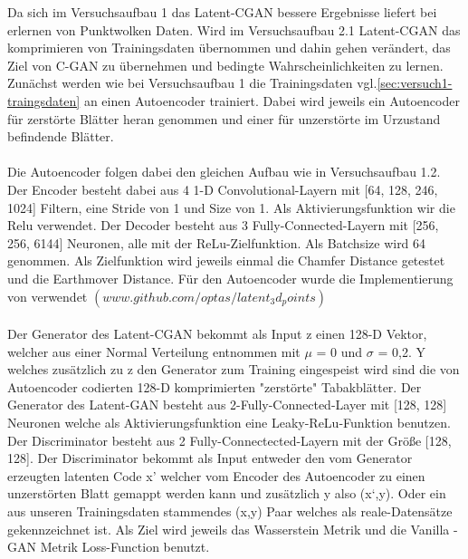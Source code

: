 \documentclass{llncs}
\begin{document}
Da sich im Versuchsaufbau 1 das Latent-CGAN bessere Ergebnisse liefert bei erlernen von Punktwolken Daten. Wird im Versuchsaufbau 2.1 Latent-CGAN das komprimieren von Trainingsdaten übernommen und dahin gehen verändert, das Ziel von C-GAN zu übernehmen und bedingte Wahrscheinlichkeiten zu lernen. Zunächst werden wie bei Versuchsaufbau 1 die Trainingsdaten vgl.\ref{sec:versuch1-traingsdaten} an einen Autoencoder trainiert. Dabei wird jeweils ein Autoencoder für zerstörte Blätter heran genommen und einer für unzerstörte im Urzustand befindende Blätter.
\\\\
Die Autoencoder folgen dabei den gleichen Aufbau wie in Versuchsaufbau 1.2. Der Encoder besteht dabei aus 4 1-D Convolutional-Layern mit [64, 128, 246, 1024] Filtern, eine Stride von 1 und Size von 1. Als Aktivierungsfunktion wir die Relu verwendet. Der Decoder besteht aus 3 Fully-Connected-Layern mit [256, 256, 6144] Neuronen, alle mit der ReLu-Zielfunktion. Als Batchsize wird 64 genommen. Als Zielfunktion wird jeweils einmal die Chamfer Distance getestet und die Earthmover Distance. Für den Autoencoder wurde die Implementierung von \cite{3dgan} verwendet $(www.github.com/optas/latent_3d_points)$ 
\\\\
Der Generator des Latent-CGAN bekommt als Input z einen 128-D Vektor, welcher aus einer Normal Verteilung entnommen mit $\mu$ = 0 und $\sigma$ =  0,2. Y welches zusätzlich zu z den Generator zum Training eingespeist wird sind die von Autoencoder codierten 128-D komprimierten "zerstörte" Tabakblätter. Der Generator des Latent-GAN besteht aus 2-Fully-Connected-Layer mit [128, 128] Neuronen welche als Aktivierungsfunktion eine Leaky-ReLu-Funktion benutzen. Der Discriminator besteht aus 2 Fully-Connectected-Layern mit der Größe [128, 128]. Der Discriminator bekommt als Input entweder den vom Generator erzeugten latenten Code x' welcher vom Encoder des Autoencoder zu einen unzerstörten Blatt gemappt werden kann und zusätzlich y also (x`,y). Oder ein aus unseren Trainingsdaten stammendes (x,y) Paar welches als reale-Datensätze gekennzeichnet ist. Als Ziel wird jeweils das Wasserstein Metrik und die Vanilla - GAN Metrik Loss-Function benutzt.
\\\\
\end{document}
